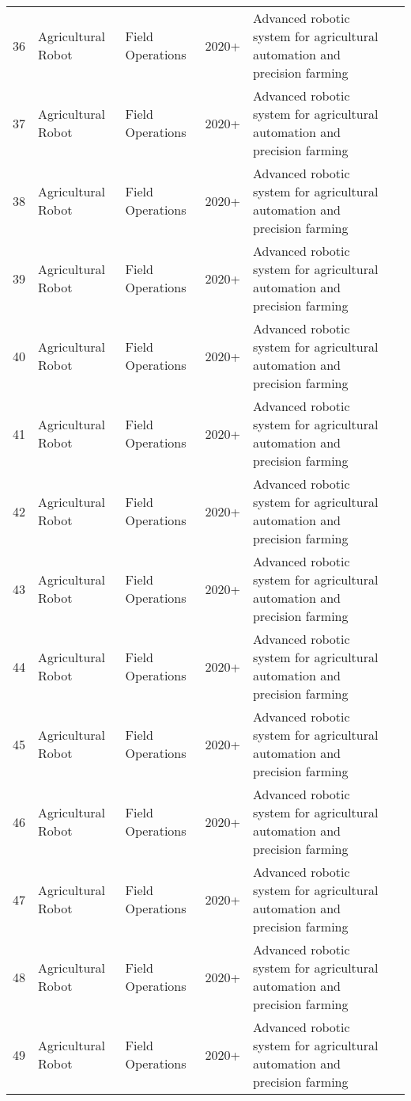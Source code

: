 \begin{table*}[htbp]
\begin{tabular}{p{}p{}p{}p{}p{}p{}}
 36 & Agricultural Robot & Field Operations & 2020+ & Advanced robotic system for agricultural automation and precision farming & \cite{kusumam20173d} \\
 37 & Agricultural Robot & Field Operations & 2020+ & Advanced robotic system for agricultural automation and precision farming & \cite{ling2019dual} \\
 38 & Agricultural Robot & Field Operations & 2020+ & Advanced robotic system for agricultural automation and precision farming & \cite{lin2021collision} \\
 39 & Agricultural Robot & Field Operations & 2020+ & Advanced robotic system for agricultural automation and precision farming & \cite{qiang2014identification} \\
 40 & Agricultural Robot & Field Operations & 2020+ & Advanced robotic system for agricultural automation and precision farming & \cite{li2016characterizing} \\
 41 & Agricultural Robot & Field Operations & 2020+ & Advanced robotic system for agricultural automation and precision farming & \cite{andujar2016using} \\
 42 & Agricultural Robot & Field Operations & 2020+ & Advanced robotic system for agricultural automation and precision farming & \cite{navas2021soft} \\
 43 & Agricultural Robot & Field Operations & 2020+ & Advanced robotic system for agricultural automation and precision farming & \cite{hemming2014fruit} \\
 44 & Agricultural Robot & Field Operations & 2020+ & Advanced robotic system for agricultural automation and precision farming & \cite{samtani2019status} \\
 45 & Agricultural Robot & Field Operations & 2020+ & Advanced robotic system for agricultural automation and precision farming & \cite{dutta2020cleaning} \\
 46 & Agricultural Robot & Field Operations & 2020+ & Advanced robotic system for agricultural automation and precision farming & \cite{luo2020identifying} \\
 47 & Agricultural Robot & Field Operations & 2020+ & Advanced robotic system for agricultural automation and precision farming & \cite{liu2017research} \\
 48 & Agricultural Robot & Field Operations & 2020+ & Advanced robotic system for agricultural automation and precision farming & \cite{lalander2015vermicomposting} \\
 49 & Agricultural Robot & Field Operations & 2020+ & Advanced robotic system for agricultural automation and precision farming & \cite{sumesh2021integration} \\

\end{tabular}
\end{table*}
